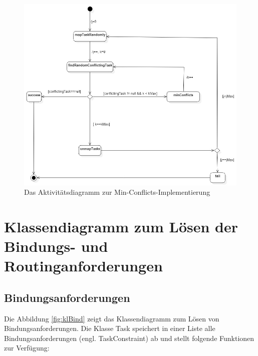 \begin{figure}[H]\centering
  \includegraphics[width = 150mm]{bilder/minAkti.jpg}
  \caption{Das Aktivitätsdiagramm zur Min-Conflicts-Implementierung}\label{fig:minConflictsAkti}
\end{figure}
\section{Klassendiagramm zum Lösen der Bindungs- und Routinganforderungen}


\subsection{Bindungsanforderungen}\label{bindunganforderung}

Die Abbildung \ref{fig:klBind} zeigt das Klassendiagramm zum Lösen von Bindungsanforderungen. Die Klasse Task speichert in einer Liste alle Bindungsanforderungen (engl. TaskConstraint) ab und stellt folgende Funktionen zur Verfügung:

